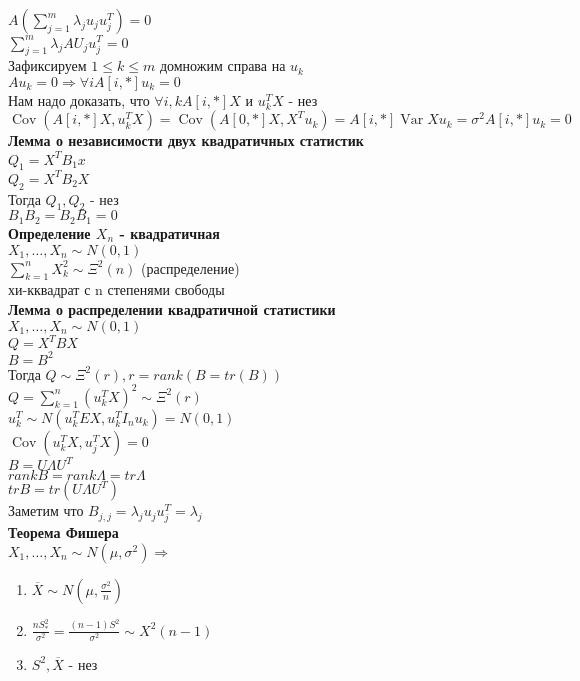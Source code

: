 \documentclass{article}
\newcommand\0{\mathbb{0}}
\DeclareMathOperator{\Var}{Var}
\DeclareMathOperator{\Cov}{Cov}
\newcommand\1{\mathbb{1}}
\newcommand{\Rto}{\Rightarrow}
\begin{document}
$A(\displaystyle\sum_{j = 1}^m \lambda_j u_j u_j^T) = 0$\\
$\displaystyle\sum_{j = 1}^m \lambda_j A U_j u_j^T = 0$\\
Зафиксируем $1 \leq k \leq m$ домножим справа на $u_k$\\
$Au_k = 0 \Rto \forall i A[i, *]u_k = 0$\\
Нам надо доказать, что $\forall i, k A[i, *]X$ и $u_k^TX$ - нез\\
$\Cov(A[i, *]X, u_k^TX) = \Cov(A[0, *]X, X^Tu_k) = A[i, *] \Var X u_k = \sigma^2 A[i, *]u_k = 0$\\
\textbf{Лемма о независимости двух квадратичных статистик}\\
$Q_1 = X^T B_1 x$\\
$Q_2 = X^TB_2X$\\
Тогда $Q_1, Q_2$ - нез\\
$B_1 B_2 = B_2 B_1 = 0$\\
\textbf{Определение $X_n$ - квадратичная}\\
$X_1, \dots, X_n \sim N(0, 1)$\\
$\displaystyle\sum_{k = 1}^{n}X_k^2 \sim \Xi^2(n)$ (распределение)\\
хи-кквадрат с n степенями свободы\\
\textbf{Лемма о распределении квадратичной статистики}\\
$X_1, \dots, X_n \sim N(0, 1)$\\
$Q = X^TBX$\\
$B = B^2$\\
Тогда $Q \sim \Xi^2(r), r = rank(B = tr(B))$\\
$Q = \displaystyle\sum_{k = 1}^n (u_k^T X)^2 \sim \Xi^2(r)$\\
$u_k^T \sim N(u_k^T EX, u_k^T I_nu_k) = N(0, 1)$\\
$\Cov(u_k^TX, u_j^TX) = 0$\\
$B = U \Lambda U^T$\\
$rank B = rank \Lambda = tr \Lambda$\\
$tr B = tr(U \Lambda U^T)$\\
Заметим что $B_{j, j} = \lambda_j u_j u_j^T = \lambda_j$\\
\textbf{Теорема Фишера}\\
$X_1, \dots, X_n \sim N(\mu, \sigma^2) \Rto$\\
\begin{enumerate}
    \item $\overline{X} \sim N(\mu, \frac{\sigma^2}{n})$
    \item $\frac{n S_*^2}{\sigma^2} = \frac{(n - 1)S^2}{\sigma^2} \sim X^2(n - 1)$
    \item $S^2, \overline{X}$ - нез
\end{enumerate}
\end{document}
